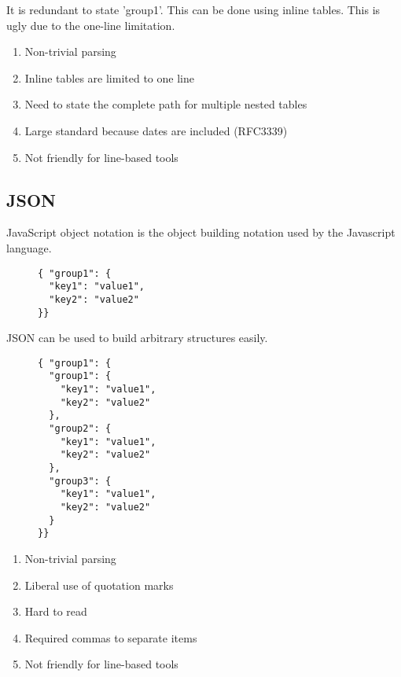 \documentclass[listof=totoc]{article}
\begin{document}
\noindent It is redundant to state 'group1'. This can be done using inline tables. This is ugly due to the one-line limitation.

\begin{enumerate}
  \item Non-trivial parsing
  \item Inline tables are limited to one line
  \item Need to state the complete path for multiple nested tables
  \item Large standard because dates are included (RFC3339)
  \item Not friendly for line-based tools
\end{enumerate}

\subsection{JSON}
\noindent JavaScript object notation is the object building notation used by the Javascript language.


\begin{figure}[H]
\centering
\begin{varwidth}{\linewidth}
\begin{verbatim}
{ "group1": {
  "key1": "value1",
  "key2": "value2"
}}
\end{verbatim}
\end{varwidth}
\caption{}
\end{figure}

\noindent JSON can be used to build arbitrary structures easily.


\begin{figure}[H]
\centering
\begin{varwidth}{\linewidth}
\begin{verbatim}
{ "group1": {
  "group1": {
    "key1": "value1",
    "key2": "value2"
  },
  "group2": {
    "key1": "value1",
    "key2": "value2"
  },
  "group3": {
    "key1": "value1",
    "key2": "value2"
  }
}}
\end{verbatim}
\end{varwidth}
\caption{}
\end{figure}

\begin{enumerate}
  \item Non-trivial parsing
  \item Liberal use of quotation marks
  \item Hard to read
  \item Required commas to separate items
  \item Not friendly for line-based tools
\end{enumerate}
\end{document}
